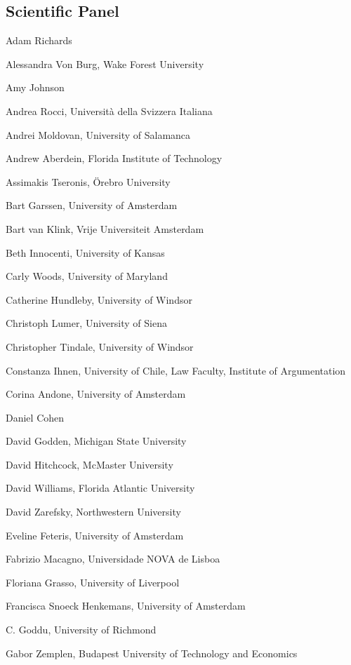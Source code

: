 	\subsection*{Scientific Panel}
	\begin{compactitem}[]
		\item[] Adam Richards
		\item[] Alessandra Von Burg, Wake Forest University
		\item[] Amy Johnson
		\item[] Andrea Rocci, Università della Svizzera Italiana
		\item[] Andrei Moldovan, University of Salamanca
		\item[] Andrew Aberdein, Florida Institute of Technology
		\item[] Assimakis Tseronis, Örebro University
		\item[] Bart Garssen, University of Amsterdam
		\item[] Bart van Klink, Vrije Universiteit Amsterdam
		\item[] Beth Innocenti, University of Kansas
		\item[] Carly Woods, University of Maryland
		\item[] Catherine Hundleby, University of Windsor
		\item[] Christoph Lumer, University of Siena
		\item[] Christopher Tindale, University of Windsor
		\item[] Constanza Ihnen, University of Chile, Law Faculty, Institute of Argumentation
		\item[] Corina Andone, University of Amsterdam
		\item[] Daniel Cohen
		\item[] David Godden, Michigan State University
		\item[] David Hitchcock, McMaster University
		\item[] David Williams, Florida Atlantic University
		\item[] David Zarefsky, Northwestern University
		\item[] Eveline Feteris, University of Amsterdam
		\item[] Fabrizio Macagno, Universidade NOVA de Lisboa
		\item[] Floriana Grasso, University of Liverpool
		\item[] Francisca Snoeck Henkemans, University of Amsterdam
		\item[] C. Goddu, University of Richmond
		\item[] Gabor Zemplen, Budapest University of Technology and Economics

\end{compactitem}
